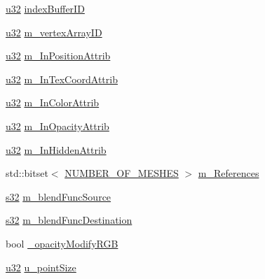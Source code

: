 \begin{DoxyCompactItemize}
\item 
\mbox{\hyperlink{_util_8h_a10e94b422ef0c20dcdec20d31a1f5049}{u32}} \mbox{\hyperlink{classnjli_1_1_geometry_aa4b1af9c522fda1a6f4aa6d92bce806f}{index\+Buffer\+ID}}
\item 
\mbox{\hyperlink{_util_8h_a10e94b422ef0c20dcdec20d31a1f5049}{u32}} \mbox{\hyperlink{classnjli_1_1_geometry_a2aa12f424eb0ff7e66138470f14a9544}{m\+\_\+vertex\+Array\+ID}}
\item 
\mbox{\hyperlink{_util_8h_a10e94b422ef0c20dcdec20d31a1f5049}{u32}} \mbox{\hyperlink{classnjli_1_1_geometry_a3c49bfc26e8e421c3321223cf607ff96}{m\+\_\+\+In\+Position\+Attrib}}
\item 
\mbox{\hyperlink{_util_8h_a10e94b422ef0c20dcdec20d31a1f5049}{u32}} \mbox{\hyperlink{classnjli_1_1_geometry_a17d04db635e9cfdf49eb928f41569cb8}{m\+\_\+\+In\+Tex\+Coord\+Attrib}}
\item 
\mbox{\hyperlink{_util_8h_a10e94b422ef0c20dcdec20d31a1f5049}{u32}} \mbox{\hyperlink{classnjli_1_1_geometry_a1c6c813d0d983d18f5f0463b476f8477}{m\+\_\+\+In\+Color\+Attrib}}
\item 
\mbox{\hyperlink{_util_8h_a10e94b422ef0c20dcdec20d31a1f5049}{u32}} \mbox{\hyperlink{classnjli_1_1_geometry_ae15315943bb9830d57a1e7a67dfa04ab}{m\+\_\+\+In\+Opacity\+Attrib}}
\item 
\mbox{\hyperlink{_util_8h_a10e94b422ef0c20dcdec20d31a1f5049}{u32}} \mbox{\hyperlink{classnjli_1_1_geometry_ac455a1ec0567cade34b5453e32ba463f}{m\+\_\+\+In\+Hidden\+Attrib}}
\item 
std\+::bitset$<$ \mbox{\hyperlink{_geometry_8h_a32926a2aa4b4f89492e39e960367a9af}{N\+U\+M\+B\+E\+R\+\_\+\+O\+F\+\_\+\+M\+E\+S\+H\+ES}} $>$ \mbox{\hyperlink{classnjli_1_1_geometry_a1a70685ec5ec85f08adbd7277590a67c}{m\+\_\+\+References}}
\item 
\mbox{\hyperlink{_util_8h_aa62c75d314a0d1f37f79c4b73b2292e2}{s32}} \mbox{\hyperlink{classnjli_1_1_geometry_a9913325754224a04d80c97942c5d0590}{m\+\_\+blend\+Func\+Source}}
\item 
\mbox{\hyperlink{_util_8h_aa62c75d314a0d1f37f79c4b73b2292e2}{s32}} \mbox{\hyperlink{classnjli_1_1_geometry_afa9f334ee74381bb6bb7f2487943ebd5}{m\+\_\+blend\+Func\+Destination}}
\item 
bool \mbox{\hyperlink{classnjli_1_1_geometry_a4bb3529fcfb94e4567ec743bafdcb033}{\+\_\+opacity\+Modify\+R\+GB}}
\item 
\mbox{\hyperlink{_util_8h_a10e94b422ef0c20dcdec20d31a1f5049}{u32}} \mbox{\hyperlink{classnjli_1_1_geometry_ac5c7f121590883537de568962f8e3b96}{u\+\_\+point\+Size}}

\end{DoxyCompactItemize}
